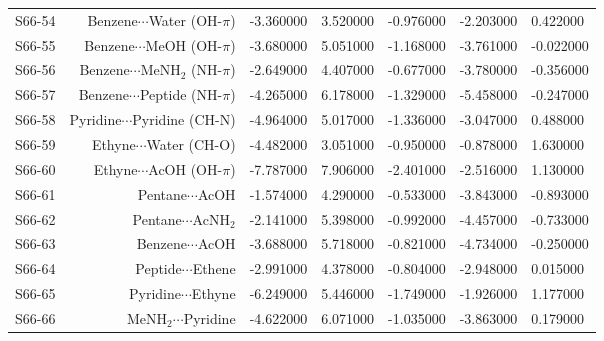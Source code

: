 \begin{table}
\begin{adjustbox}{center}
\begin{tabular}{lrrrrr}
S66-54 & Benzene$\cdots$Water (OH-$\pi$) & -3.360000 & 3.520000 & -0.976000 & -2.203000 & 0.422000 \\
S66-55 & Benzene$\cdots$MeOH (OH-$\pi$) & -3.680000 & 5.051000 & -1.168000 & -3.761000 & -0.022000 \\
S66-56 & Benzene$\cdots$MeNH$_2$ (NH-$\pi$) & -2.649000 & 4.407000 & -0.677000 & -3.780000 & -0.356000 \\
S66-57 & Benzene$\cdots$Peptide (NH-$\pi$) & -4.265000 & 6.178000 & -1.329000 & -5.458000 & -0.247000 \\
S66-58 & Pyridine$\cdots$Pyridine (CH-N) & -4.964000 & 5.017000 & -1.336000 & -3.047000 & 0.488000 \\
S66-59 & Ethyne$\cdots$Water (CH-O) & -4.482000 & 3.051000 & -0.950000 & -0.878000 & 1.630000 \\
S66-60 & Ethyne$\cdots$AcOH (OH-$\pi$) & -7.787000 & 7.906000 & -2.401000 & -2.516000 & 1.130000 \\
S66-61 & Pentane$\cdots$AcOH & -1.574000 & 4.290000 & -0.533000 & -3.843000 & -0.893000 \\
S66-62 & Pentane$\cdots$AcNH$_2$ & -2.141000 & 5.398000 & -0.992000 & -4.457000 & -0.733000 \\
S66-63 & Benzene$\cdots$AcOH & -3.688000 & 5.718000 & -0.821000 & -4.734000 & -0.250000 \\
S66-64 & Peptide$\cdots$Ethene & -2.991000 & 4.378000 & -0.804000 & -2.948000 & 0.015000 \\
S66-65 & Pyridine$\cdots$Ethyne & -6.249000 & 5.446000 & -1.749000 & -1.926000 & 1.177000 \\
S66-66 & MeNH$_2$$\cdots$Pyridine & -4.622000 & 6.071000 & -1.035000 & -3.863000 & 0.179000 \\
\bottomrule
\end{tabular}
\end{adjustbox}
\end{table}